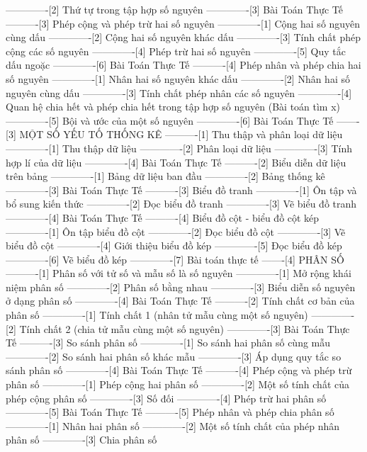 -------------[2] Thứ tự trong tập hợp số nguyên
-------------[3] Bài Toán Thực Tế
----------[3] Phép cộng và phép trừ hai số nguyên
-------------[1] Cộng hai số nguyên cùng dấu
-------------[2] Cộng hai số nguyên khác dấu
-------------[3] Tính chất phép cộng các số nguyên
-------------[4] Phép trừ hai số nguyên
-------------[5] Quy tắc dấu ngoặc
-------------[6] Bài Toán Thực Tế
----------[4] Phép nhân và phép chia hai số nguyên
-------------[1] Nhân hai số nguyên khác dấu
-------------[2] Nhân hai số nguyên cùng dấu
-------------[3] Tính chất phép nhân các số nguyên
-------------[4] Quan hệ chia hết và phép chia hết trong tập hợp số nguyên (Bài toán tìm x)
-------------[5] Bội và ước của một số nguyên
-------------[6] Bài Toán Thực Tế
-------[3] MỘT SỐ YẾU TỐ THỐNG KÊ
----------[1] Thu thập và phân loại dữ liệu
-------------[1] Thu thập dữ liệu
-------------[2] Phân loại dữ liệu
-------------[3] Tính hợp lí của dữ liệu
-------------[4] Bài Toán Thực Tế
----------[2] Biểu diễn dữ liệu trên bảng
-------------[1] Bảng dữ liệu ban đầu
-------------[2] Bảng thống kê
-------------[3] Bài Toán Thực Tế
----------[3] Biểu đồ tranh
-------------[1] Ôn tập và bổ sung kiến thức
-------------[2] Đọc biểu đồ tranh
-------------[3] Vẽ biểu đồ tranh
-------------[4] Bài Toán Thực Tế
----------[4] Biểu đồ cột - biểu đồ cột kép
-------------[1] Ôn tập biểu đồ cột
-------------[2] Đọc biểu đồ cột
-------------[3] Vẽ biểu đồ cột
-------------[4] Giới thiệu biểu đồ kép
-------------[5] Đọc biểu đồ kép
-------------[6] Vẽ biểu đồ kép
-------------[7] Bài toán thực tế
-------[4] PHÂN SỐ
----------[1] Phân số với tử số và mẫu số là số nguyên
-------------[1] Mở rộng khái niệm phân số
-------------[2] Phân số bằng nhau
-------------[3] Biểu diễn số nguyên ở dạng phân số
-------------[4] Bài Toán Thực Tế
----------[2] Tính chất cơ bản của phân số
-------------[1] Tính chất 1 (nhân tử mẫu cùng một số nguyên)
-------------[2] Tính chất 2 (chia tử mẫu cùng một số nguyên)
-------------[3] Bài Toán Thực Tế
----------[3] So sánh phân số
-------------[1] So sánh hai phân số cùng mẫu
-------------[2] So sánh hai phân số khác mẫu
-------------[3] Áp dụng quy tắc so sánh phân số
-------------[4] Bài Toán Thực Tế
----------[4] Phép cộng và phép trừ phân số
-------------[1] Phép cộng hai phân số
-------------[2] Một số tính chất của phép cộng phân số
-------------[3] Số đối
-------------[4] Phép trừ hai phân số
-------------[5] Bài Toán Thực Tế
----------[5] Phép nhân và phép chia phân số
-------------[1] Nhân hai phân số
-------------[2] Một số tính chất của phép nhân phân số
-------------[3] Chia phân số
